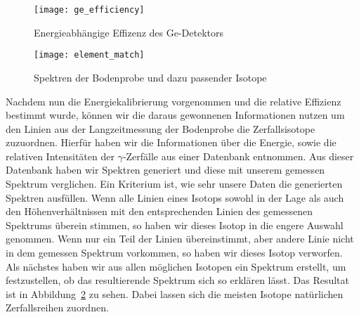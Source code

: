 \documentclass[11pt, ngerman, fleqn, DIV=15, headinclude, BCOR=2cm]{scrreprt}
\newcommand{\plotwidth}{0.8\linewidth}
\begin{document}
\begin{figure}
    \centering
    \texttt{[image: ge\_efficiency]}
    \caption{%
	    Energieabhängige Effizenz des Ge-Detektors
    }
    \label{fig:effizienz}
\end{figure}

\clearpage

\begin{figure}
    \centering
    \texttt{[image: element\_match]}
    \caption{%
	    Spektren der Bodenprobe und dazu passender Isotope
    }
    \label{fig:element_match}
\end{figure}

Nachdem nun die Energiekalibrierung vorgenommen und die relative
Effizienz bestimmt wurde, können wir die daraus gewonnenen Informationen nutzen
um den Linien aus der Langzeitmessung der Bodenprobe die Zerfallsisotope
zuzuordnen.
Hierfür haben wir die Informationen über die Energie, sowie die relativen
Intensitäten der $\gamma$-Zerfälle aus einer Datenbank
\parencite{IAEA-gamma-ray-database} entnommen.
Aus dieser Datenbank haben wir Spektren generiert und diese mit unserem gemessen
Spektrum verglichen.
Ein Kriterium ist, wie sehr unsere Daten die generierten Spektren
ausfüllen. Wenn alle Linien eines Isotops sowohl in der Lage als auch den
Höhenverhältnissen
mit den entsprechenden Linien des gemessenen Spektrums überein stimmen, so haben
wir dieses Isotop in die engere Auswahl genommen. Wenn nur ein Teil der Linien
übereinstimmt, aber andere Linie nicht in dem gemessen Spektrum vorkommen, so
haben wir dieses Isotop verworfen.
Als nächstes haben wir aus allen möglichen Isotopen ein Spektrum erstellt, um
festzustellen, ob das resultierende Spektrum sich so erklären lässt.
Das Resultat ist in Abbildung~\ref{fig:element_match} zu sehen.
Dabei lassen sich die meisten Isotope natürlichen Zerfallsreihen zuordnen.
\end{document}
